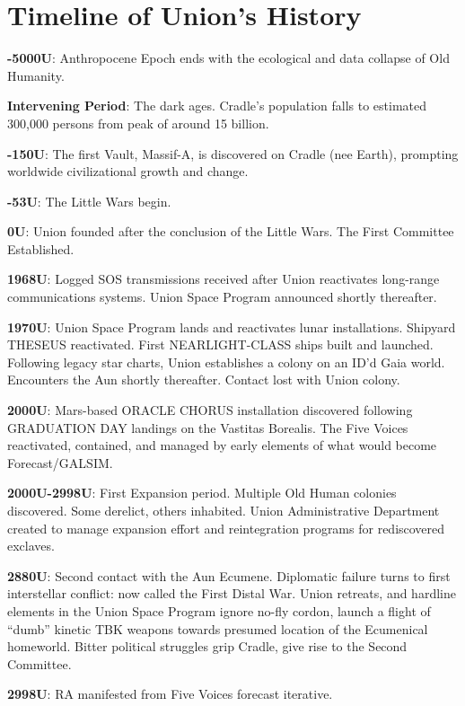 \section{Timeline of Union's History}

\textbf{-5000U}: Anthropocene Epoch ends with the ecological and data collapse of Old Humanity.

\textbf{Intervening Period}: The dark ages. Cradle’s population falls to estimated 300,000 persons from
peak of around 15 billion.

\textbf{-150U}: The first Vault, Massif-A, is discovered on Cradle (nee Earth), prompting worldwide
civilizational growth and change.

\textbf{-53U}: The Little Wars begin.

\textbf{0U}: Union founded after the conclusion of the Little Wars. The First Committee Established.

\textbf{1968U}: Logged SOS transmissions received after Union reactivates long-range communications
systems. Union Space Program announced shortly thereafter.

\textbf{1970U}: Union Space Program lands and reactivates lunar installations. Shipyard THESEUS
reactivated. First  NEARLIGHT-CLASS ships built and launched. Following legacy star charts,
Union establishes a colony on an ID’d Gaia world. Encounters the Aun shortly thereafter. Contact
lost with Union colony.

\textbf{2000U}: Mars-based ORACLE CHORUS installation discovered following GRADUATION DAY
landings on the Vastitas Borealis. The Five Voices reactivated, contained, and managed by early
elements of what would become Forecast/GALSIM.

\textbf{2000U-2998U}: First Expansion period. Multiple Old Human colonies discovered. Some derelict,
others inhabited. Union Administrative Department created to manage expansion effort and
reintegration programs for rediscovered exclaves.

\textbf{2880U}: Second contact with the Aun Ecumene. Diplomatic failure turns to first interstellar
conflict: now called the First Distal War. Union retreats, and hardline elements in the Union Space
Program ignore no-fly cordon, launch a flight of “dumb” kinetic TBK weapons towards presumed
location of the Ecumenical homeworld. Bitter political struggles grip Cradle, give rise to the
Second Committee.

\textbf{2998U}: RA manifested from Five Voices forecast iterative.

